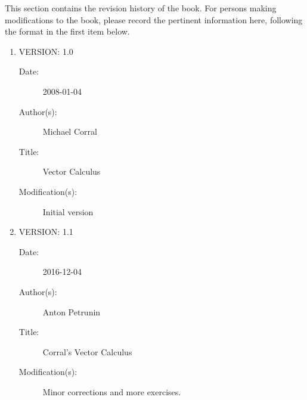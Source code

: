 \documentclass[letterpaper,11pt,titlepage,openany,twoside,numbers=noenddot,bibliography=totoc,index=totoc]{scrbook}
\theoremstyle{definition}
\theoremstyle{itexmp}
\newcommand\myclearpage{\cleartooddpage
 [\thispagestyle{empty}]}
\numberwithin{figure}{section}
\begin{document}

\tableofcontents
\mainmatter





\newpage

\nocite{*}

%
%
\newpage

This section contains the revision history of the book.  For persons making modifications to 
the book, please record the pertinent information here, following the format in the first item below.

\begin{enumerate}

\item VERSION: 1.0
\begin{description}
\item[Date:] 2008-01-04
\item[Author(s):] Michael Corral
\item[Title:] Vector Calculus
\item[Modification(s):] Initial version
\end{description}

\item VERSION: 1.1
\begin{description}
\item[Date:] 2016-12-04
\item[Author(s):] Anton Petrunin
\item[Title:] Corral's Vector Calculus
\item[Modification(s):] 
Minor corrections and more exercises.
\end{description}

\end{enumerate}

\backmatter
\clearpage
{}
\printindex

\myclearpage
\end{document}
